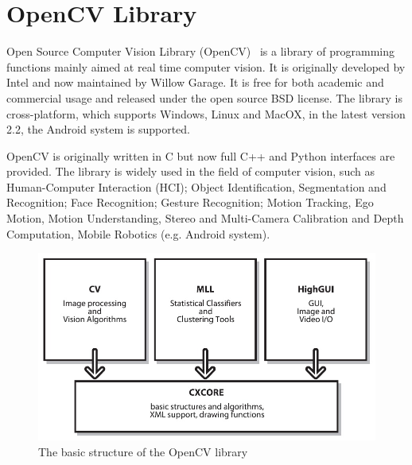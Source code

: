 \section{OpenCV Library}
\label{sec:opencv}

Open Source Computer Vision Library (OpenCV)~\cite{opencv} is a library of
programming functions mainly aimed at real time computer vision. It is
originally developed by Intel and now maintained by Willow Garage. It
is free for both academic and commercial usage and released  under the
open source BSD license. The library is cross-platform, which supports
Windows, Linux and MacOX,  in the latest version 2.2, the Android
system is supported.

OpenCV is originally written in C but now full C++ and Python
interfaces are provided. The library is widely used in the field of
computer vision, such as Human-Computer Interaction (HCI); Object
Identification, Segmentation and Recognition; Face Recognition;
Gesture Recognition; Motion Tracking, Ego Motion, Motion
Understanding, Stereo and Multi-Camera
Calibration and Depth Computation, Mobile Robotics (e.g. Android
system).

\begin{figure}[htbp]
  \centering
\includegraphics[width=\linewidth]{images/bsopencv.jpg}
  \caption[The basic structure of the OpenCV library]{The basic
    structure of the OpenCV library~\cite{bradski2008learning}}
  \label{fig:bsopencv}
\end{figure}

